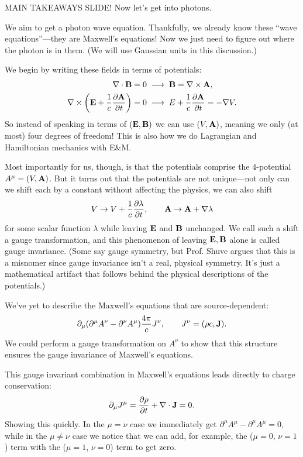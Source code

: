 \documentclass[../p164main.tex]{subfiles}
\begin{document}
MAIN TAKEAWAYS SLIDE!
Now let's get into photons.

We aim to get a photon wave equation.
Thankfully, we already know these ``wave equations''---they are Maxwell's equations!
Now we just need to figure out where the photon is in them.
(We will use Gaussian units in this discussion.)

We begin by writing these fields in terms of potentials:
\begin{align*}
    \nabla \cdot \mathbf{B} = 0 \;&\longrightarrow\; \mathbf{B} = \nabla \times \mathbf{A}, \\
    \nabla \times \left( \mathbf{E} + \frac{1}{c} \frac{\partial \mathbf{A}}{\partial t} \right) = 0 \;&\longrightarrow\; E + \frac{1}{c} \frac{\partial \mathbf{A}}{\partial t} = -\nabla V.
\end{align*}
So instead of speaking in terms of $(\mathbf{E}, \mathbf{B})$ we can use $(V, \mathbf{A})$, meaning we only (at most) four degrees of freedom!
This is also how we do Lagrangian and Hamiltonian mechanics with E\&M.

Most importantly for us, though, is that the potentials comprise the 4-potential $A^\mu = (V, \mathbf{A})$.
But it turns out that the potentials are not unique---not only can we shift each by a constant without affecting the physics, we can also shift
\[ V \to V + \frac{1}{c} \frac{\partial \lambda}{\partial t}, \qquad \mathbf{A} \to \mathbf{A} + \nabla \lambda \]
for some scalar function $\lambda$ while leaving $\mathbf{E}$ and $\mathbf{B}$ unchanged.
We call such a shift a gauge transformation, and this phenomenon of leaving $\mathbf{E}, \mathbf{B}$ alone is called gauge invariance.
(Some say gauge symmetry, but Prof. Shuve argues that this is a misnomer since gauge invariance isn't a real, physical symmetry.
It's just a mathematical artifact that follows behind the physical descriptions of the potentials.)

We've yet to describe the Maxwell's equations that are source-dependent:
\[ \partial_\mu (\partial^\mu A^\nu - \partial^\nu A^\mu) \frac{4\pi}{c} J^\nu, \qquad J^\nu = (\rho c, \mathbf{J}). \]
We could perform a gauge transformation on $A^\nu$ to show that this structure ensures the gauge invariance of Maxwell's equations.

This gauge invariant combination in Maxwell's equations leads directly to charge conservation:
\[ \partial_\mu J^\mu = \frac{\partial \rho}{\partial t} + \nabla \cdot \mathbf{J} = 0. \]
Showing this quickly.
In the $\mu = \nu$ case we immediately get $\partial^\mu A^\mu - \partial^\mu A^\mu = 0$, while in the $\mu \neq \nu$ case we notice that we can add, for example, the ($\mu = 0$, $\nu = 1$) term with the ($\mu = 1$, $\nu = 0$) term to get zero.
\end{document}
